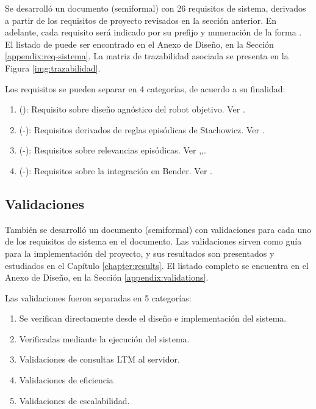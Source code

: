 Se desarrolló un documento (semiformal) con 26 requisitos de sistema, derivados a partir de los requisitos de proyecto revisados en la sección anterior. En adelante, cada requisito será indicado por su prefijo y numeración de la forma . El listado de puede ser encontrado en el Anexo de Diseño, en la Sección \ref{appendix:req-sistema}. La matriz de trazabilidad asociada se presenta en la Figura \ref{img:trazabilidad}.

Los requisitos se pueden separar en 4 categorías, de acuerdo a su finalidad:
\begin{enumerate}
\item (): Requisito sobre diseño agnóstico del robot objetivo. Ver .
\item (-): Requisitos derivados de reglas episódicas de Stachowicz. Ver .
\item (-): Requisitos sobre relevancias episódicas. Ver ,,.
\item (-): Requisitos sobre la integración en Bender. Ver .
\end{enumerate}

\subsection{Validaciones}

También se desarrolló un documento (semiformal) con validaciones para cada uno de los requisitos de sistema en el documento. Las validaciones sirven como guía para la implementación del proyecto, y sus resultados son presentados y estudiados en el Capítulo \ref{chapter:results}. El listado completo se encuentra en el Anexo de Diseño, en la Sección \ref{appendix:validations}.

Las validaciones fueron separadas en 5 categorías: 
\begin{enumerate}
	\item {} Se verifican directamente desde el diseño e implementación del sistema.
	\item {} Verificadas mediante la ejecución del sistema.
	\item {} Validaciones de consultas LTM al servidor.
	\item {} Validaciones de eficiencia
	\item {} Validaciones de escalabilidad.
\end{enumerate}

